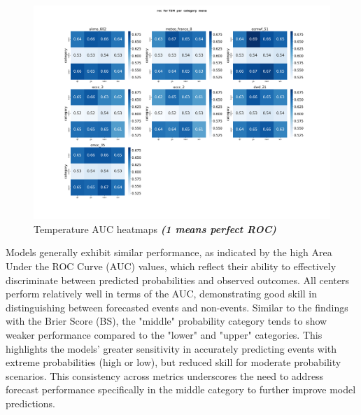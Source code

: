 \begin{figure}[H]
    \centering
    \includegraphics[width=1\linewidth]{plots/prob/roc/roc_T2M_category_mena.png}
    \caption{Temperature AUC  heatmaps \textbf{\textit{(1 means perfect ROC)}}}
\end{figure}


Models generally exhibit similar performance, as indicated by the high Area Under the ROC Curve (AUC) values, which reflect their ability to effectively discriminate between predicted probabilities and observed outcomes. All centers perform relatively well in terms of the AUC, demonstrating good skill in distinguishing between forecasted events and non-events. Similar to the findings with the Brier Score (BS), the "middle" probability category tends to show weaker performance compared to the "lower" and "upper" categories. This highlights the models' greater sensitivity in accurately predicting events with extreme probabilities (high or low), but reduced skill for moderate probability scenarios. This consistency across metrics underscores the need to address forecast performance specifically in the middle category to further improve model predictions.



